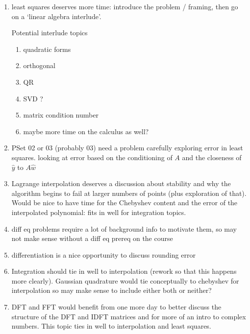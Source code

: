 \documentclass[12pt,letterpaper,noanswers]{exam}
\begin{document}
 \pdfpageheight 11in 
  \pdfpagewidth 8.5in

\begin{enumerate}
    \item least squares deserves more time: introduce the problem / framing, then go on a `linear algebra interlude'.
    
    Potential interlude topics
    \begin{enumerate}
        \item quadratic forms
        \item orthogonal
        \item QR
        \item SVD ?
        \item matrix condition number
        \item maybe more time on the calculus as well?
    \end{enumerate}
    
    \item PSet 02 or 03 (probably 03) need a problem carefully exploring error in least squares.  looking at error based on the conditioning of $A$ and the closeness of $\hat{y}$ to $A\hat{w}$
    
    \item Lagrange interpolation deserves a discussion about stability and why the algorithm begins to fail at larger numbers of points (plus exploration of that).  Would be nice to have time for the Chebyshev content and the error of the interpolated polynomial: fits in well for integration topics.
    
    \item diff eq problems require a lot of background info to motivate them, so may not make sense without a diff eq prereq on the course
    
    \item differentiation is a nice opportunity to discuss rounding error
    
    \item Integration should tie in well to interpolation (rework so that this happens more clearly).  Gaussian quadrature would tie conceptually to chebyshev for interpolation so may make sense to include either both or neither?
    
    \item DFT and FFT would benefit from one more day to better discuss the structure of the DFT and IDFT matrices and for more of an intro to complex numbers.  This topic ties in well to interpolation and least squares.
\end{enumerate}  
\end{document}
